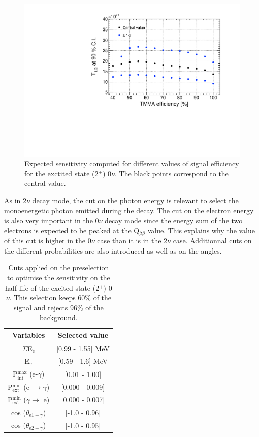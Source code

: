 \documentclass[main.tex]{subfiles}
\begin{document}
\begin{figure} [h!]
\begin{center}
\includegraphics[scale=0.5]{pictures/FinalResults/bb0nu2/SensVsEffbb0nu2.pdf}
\end{center}
\caption{Expected sensitivity computed for different values of signal efficiency for the exctited state (2$^+$) 0$\nu$. The black points correspond to the central value.}
\label{plot:SensVsEffbb0nu2_250}
\end{figure}


\NI As in 2$\nu$ decay mode, the cut on the photon energy is relevant to select the monoenergetic photon emitted during the decay. The cut on the electron energy is also very important in the 0$\nu$ decay mode since the energy sum of the two electrons is expected to be peaked at the Q$_{\beta\beta}$ value. This explains why the value of this cut is higher in the 0$\nu$ case than it is in the 2$\nu$ case. Additionnal cuts on the different probabilities are also introduced as well as on the angles. 



\FloatBarrier


\begin{table}[h!]
\centering
\begin{tabular}{c|c}
Variables & Selected value \\
\toprule
$\Sigma$E$_{\text{e}}$ & [0.99 - 1.55] MeV \\
E$_{\gamma}$    & [0.59 - 1.6] MeV \\
P$_{\text{int}}^{\text{max}}$ (e-$\gamma$) & [0.01 - 1.00] \\
P$_{\text{ext}}^{\text{min}}$ (e $\rightarrow \gamma$) & [0.000 - 0.009] \\
P$_{\text{ext}}^{\text{min}}$ ($\gamma \rightarrow$ e) & [0.000 - 0.007] \\
cos ($\theta_{\text{e1}-\gamma}$) & [-1.0 - 0.96] \\
cos ($\theta_{\text{e2}-\gamma}$) & [-1.0 - 0.95] \\
\bottomrule
\end{tabular}
\caption{Cuts applied on the preselection to optimise the sensitivity on the half-life of the excited state (2$^+$) 0$\nu$. This selection keeps 60\% of the signal and rejects 96\% of the background.}
\label{tab:Cuts0nu2Plus250keV}
\end{table}
\end{document}

